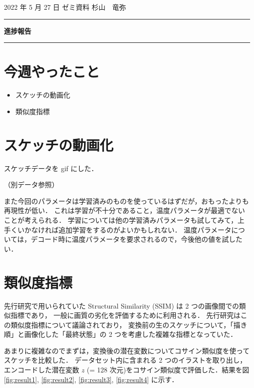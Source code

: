 \documentclass[onecolumn]{ujarticle}   %
\begin{document}

		\noindent
		\hspace{1em}
		2022 年 5 月 27 日
		ゼミ資料
		\hfill
		杉山　竜弥
		\vspace{2mm}

		\hrule
		\begin{center}
			{\Large \bf 進捗報告}
		\end{center}
		\hrule
		\vspace{9mm}


\section{今週やったこと}
\begin{itemize}
  \item スケッチの動画化
  \item 類似度指標
\end{itemize}

\section{スケッチの動画化}
スケッチデータを gif にした．

（別データ参照）

また今回のパラメータは学習済みのものを使っているはずだが，おもったよりも再現性が低い．
これは学習が不十分であること，温度パラメータが最適でないことが考えられる．
学習については他の学習済みパラメータも試してみて，上手くいかなければ追加学習をするのがよいかもしれない．
温度パラメータについては，デコード時に温度パラメータを要求されるので，今後他の値を試したい．

\section{類似度指標}
先行研究で用いられていた Structural Similarity (SSIM) は 2 つの画像間での類似指標であり，
一般に画質の劣化を評価するために利用される．
先行研究はこの類似度指標について議論されており，
変換前の生のスケッチについて，「描き順」と画像化した「最終状態」の 2 つを考慮した複雑な指標となっていた．

あまりに複雑なのでまずは，変換後の潜在変数についてコサイン類似度を使ってスケッチを比較した．
データセット内に含まれる 2 つのイラストを取り出し，エンコードした潜在変数 $z$ (= 128 次元)をコサイン類似度で評価した．結果を図 \ref{fig:result1}, \ref{fig:result2}, \ref{fig:result3}, \ref{fig:result4} に示す．
\end{document}
